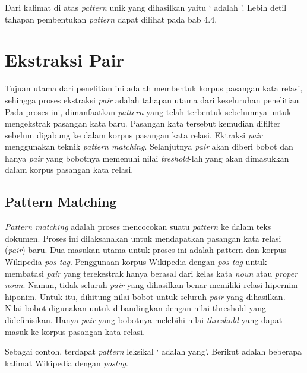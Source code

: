 \noindent Dari kalimat di atas \textit{pattern} unik yang dihasilkan yaitu `{\tagHyponym} adalah {\tagHypernym}'. Lebih detil tahapan pembentukan \textit{pattern} dapat dilihat pada bab 4.4.


\section{Ekstraksi Pair}
Tujuan utama dari penelitian ini adalah membentuk korpus pasangan kata relasi, sehingga proses ekstraksi \textit{pair} adalah tahapan utama dari keseluruhan penelitian. Pada proses ini, dimanfaatkan \textit{pattern} yang telah terbentuk sebelumnya untuk mengekstrak pasangan kata baru. Pasangan kata tersebut kemudian difilter sebelum digabung ke dalam korpus pasangan kata relasi. Ektraksi \textit{pair} menggunakan teknik \textit{pattern matching}. Selanjutnya \textit{pair} akan diberi bobot dan hanya \textit{pair} yang bobotnya memenuhi nilai \textit{treshold}-lah yang akan dimasukkan dalam korpus pasangan kata relasi.

\subsection{Pattern Matching}
\textit{Pattern matching} adalah proses mencocokan suatu \textit{pattern} ke dalam teks dokumen. Proses ini dilaksanakan untuk mendapatkan pasangan kata relasi (\textit{pair}) baru. Dua masukan utama untuk proses ini adalah pattern dan korpus Wikipedia \textit{pos tag}. Penggunaan korpus Wikipedia dengan \textit{pos tag} untuk membatasi \textit{pair} yang terekestrak hanya berasal dari kelas kata \textit{noun} atau \textit{proper noun}. Namun, tidak seluruh \textit{pair} yang dihasilkan benar memiliki relasi hipernim-hiponim. Untuk itu, dihitung nilai bobot untuk seluruh \textit{pair} yang dihasilkan. Nilai bobot digunakan untuk dibandingkan dengan nilai threshold yang didefinisikan. Hanya \textit{pair} yang bobotnya melebihi nilai \textit{threshold} yang dapat masuk ke korpus pasangan kata relasi.

Sebagai contoh, terdapat \textit{pattern} leksikal `{\tagHyponym} adalah {\tagHypernym} yang'. Berikut adalah beberapa kalimat Wikipedia dengan \textit{postag}.

